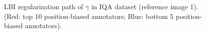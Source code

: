\documentclass[10pt,journal,cspaper,compsoc]{IEEEtran}
\begin{document}
{\begin{figure}
 \begin{center}
  \caption{LBI regularization path of $\gamma$ in IQA dataset (reference image 1). (Red: top 10 position-biased annotators; Blue: bottom 5 position-biased annotators).} \label{fig:iqa_position}
\end{center}
\end{figure}









}
\end{document}
